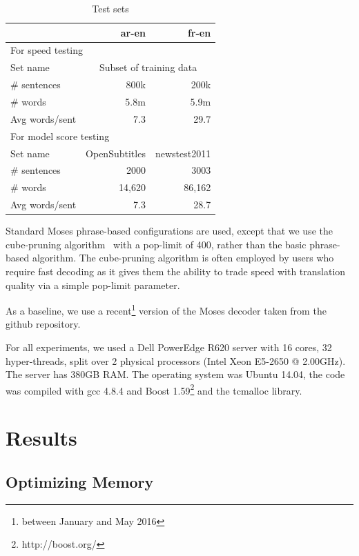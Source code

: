 \documentclass[11pt]{article}
\begin{document}
\begin{table}[h]
\begin{center}
\small
\begin{tabular}{|l|r|r|} \hline
		& ar-en		& fr-en \\ \hline
\multicolumn{3}{|l|}{For speed testing} \\ \hline
Set name	& \multicolumn{2}{|c|}{Subset of training data} \\
\# sentences  	& 800k 		& 200k \\
\# words 	& 5.8m 		& 5.9m \\ 
Avg words/sent	& 7.3		& 29.7 \\ \hline
\multicolumn{3}{|l|}{For model score testing} \\ \hline
Set name	& OpenSubtitles	& newstest2011 \\
\# sentences  	& 2000 		& 3003 \\
\# words 	& 14,620 	& 86,162 \\ 
Avg words/sent	& 7.3		& 28.7 \\ \hline
\end{tabular}
\end{center}
\caption{Test sets}
\label{tab:test-sets}
\end{table}

Standard Moses phrase-based configurations are used, except that we use the cube-pruning algorithm~\cite{Chiang:2007:cl} with a pop-limit of 400, rather than the basic phrase-based algorithm. The cube-pruning algorithm is often employed by users who require fast decoding as it gives them the ability to trade speed with translation quality via a simple pop-limit parameter.

As a baseline, we use a recent\footnote{between January and May 2016} version of the Moses decoder taken from the github repository.

For all experiments, we used a Dell PowerEdge R620 server with 16 cores, 32 hyper-threads, split over 2 physical processors (Intel Xeon E5-2650 @ 2.00GHz). The server has 380GB RAM. The operating system was Ubuntu 14.04, the code was compiled with gcc 4.8.4 and Boost 1.59\footnote{http://boost.org/} and the tcmalloc library.

\section{Results}

\subsection{Optimizing Memory}
\end{document}
